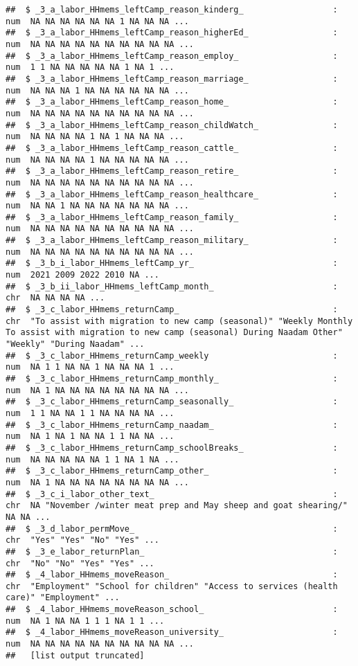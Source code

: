 \documentclass[
]{article}
\begin{document}
\begin{verbatim}
##  $ _3_a_labor_HHmems_leftCamp_reason_kinderg_                  : num  NA NA NA NA NA NA 1 NA NA NA ...
##  $ _3_a_labor_HHmems_leftCamp_reason_higherEd_                 : num  NA NA NA NA NA NA NA NA NA NA ...
##  $ _3_a_labor_HHmems_leftCamp_reason_employ_                   : num  1 1 NA NA NA NA NA 1 NA 1 ...
##  $ _3_a_labor_HHmems_leftCamp_reason_marriage_                 : num  NA NA NA 1 NA NA NA NA NA NA ...
##  $ _3_a_labor_HHmems_leftCamp_reason_home_                     : num  NA NA NA NA NA NA NA NA NA NA ...
##  $ _3_a_labor_HHmems_leftCamp_reason_childWatch_               : num  NA NA NA NA 1 NA 1 NA NA NA ...
##  $ _3_a_labor_HHmems_leftCamp_reason_cattle_                   : num  NA NA NA NA 1 NA NA NA NA NA ...
##  $ _3_a_labor_HHmems_leftCamp_reason_retire_                   : num  NA NA NA NA NA NA NA NA NA NA ...
##  $ _3_a_labor_HHmems_leftCamp_reason_healthcare_               : num  NA NA 1 NA NA NA NA NA NA NA ...
##  $ _3_a_labor_HHmems_leftCamp_reason_family_                   : num  NA NA NA NA NA NA NA NA NA NA ...
##  $ _3_a_labor_HHmems_leftCamp_reason_military_                 : num  NA NA NA NA NA NA NA NA NA NA ...
##  $ _3_b_i_labor_HHmems_leftCamp_yr_                            : num  2021 2009 2022 2010 NA ...
##  $ _3_b_ii_labor_HHmems_leftCamp_month_                        : chr  NA NA NA NA ...
##  $ _3_c_labor_HHmems_returnCamp_                               : chr  "To assist with migration to new camp (seasonal)" "Weekly Monthly To assist with migration to new camp (seasonal) During Naadam Other" "Weekly" "During Naadam" ...
##  $ _3_c_labor_HHmems_returnCamp_weekly                         : num  NA 1 1 NA NA 1 NA NA NA 1 ...
##  $ _3_c_labor_HHmems_returnCamp_monthly_                       : num  NA 1 NA NA NA NA NA NA NA NA ...
##  $ _3_c_labor_HHmems_returnCamp_seasonally_                    : num  1 1 NA NA 1 1 NA NA NA NA ...
##  $ _3_c_labor_HHmems_returnCamp_naadam_                        : num  NA 1 NA 1 NA NA 1 1 NA NA ...
##  $ _3_c_labor_HHmems_returnCamp_schoolBreaks_                  : num  NA NA NA NA NA 1 1 NA 1 NA ...
##  $ _3_c_labor_HHmems_returnCamp_other_                         : num  NA 1 NA NA NA NA NA NA NA NA ...
##  $ _3_c_i_labor_other_text_                                    : chr  NA "November /winter meat prep and May sheep and goat shearing/" NA NA ...
##  $ _3_d_labor_permMove_                                        : chr  "Yes" "Yes" "No" "Yes" ...
##  $ _3_e_labor_returnPlan_                                      : chr  "No" "No" "Yes" "Yes" ...
##  $ _4_labor_HHmems_moveReason_                                 : chr  "Employment" "School for children" "Access to services (health care)" "Employment" ...
##  $ _4_labor_HHmems_moveReason_school_                          : num  NA 1 NA NA 1 1 1 NA 1 1 ...
##  $ _4_labor_HHmems_moveReason_university_                      : num  NA NA NA NA NA NA NA NA NA NA ...
##   [list output truncated]
\end{verbatim}
\end{document}
